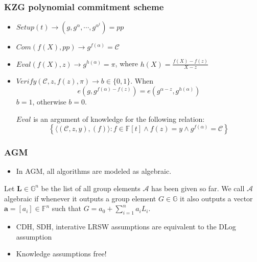 \documentclass[UFT8]{beamer}
\begin{document}
\begin{frame}
	\frametitle{KZG polynomial commitment scheme}

	\begin{itemize}
		\item $Setup(t) \rightarrow \left(g, g^\alpha, \cdots, g^{\alpha^t} \right) = pp$
		\item $Com(f(X), pp) \rightarrow g^{f(\alpha)} = \mathcal{C}$
		\item $Eval(f(X), z) \rightarrow g^{h(\alpha)} = \pi$, where $h(X) = \frac{f(X) - f(z)}{X - z}$
		\item $Verify(\mathcal{C}, z, f(z), \pi) \rightarrow b \in \{0, 1\}$. When 
		$$
		e\left(g, g^{f(\alpha) - f(z)} \right) = e\left(g^{\alpha - z}, g^{h(\alpha)}\right)
		$$
		$b=1$, otherwise $b = 0$.
		\begin{theorem}
			$Eval$ is an argument of knowledge for the following relation:
			\begin{equation*}
				\left\{\langle 
					(\mathcal{C}, z, y), (f) 
				\rangle: 
				f \in \mathbb{F}[t] \land f(z) = y \land g^{f(\alpha)} = \mathcal{C}
				\right\}
			\end{equation*}
		\end{theorem}
	\end{itemize}
\end{frame}


\begin{frame}
    \frametitle{AGM}
	\begin{itemize}
		\item In AGM, all algorithms are modeled as algebraic.
	\end{itemize}
	\begin{definition}
		Let $\mathbf{L} \in \mathbb{G}^n$ be the list of all group elements $\mathcal{A}$ has been given so far.
		We call $\mathcal{A}$ algebraic if whenever it outputs a group element $G \in \mathbb{G}$ it also outputs a vector $\mathbf{a} = [a_i] \in \mathbb{F}^n$ such that $G = a_0 + \sum_{i = 1}^{n} a_i L_i$.
	\end{definition}

	\begin{itemize}
		\item CDH, SDH, interative LRSW assumptions are equivalent to the DLog assumption
		\item Knowledge assumptions free!
	\end{itemize}
\end{frame}
\end{document}
